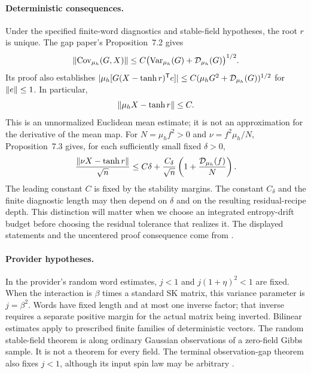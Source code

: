 \paragraph{Deterministic consequences.}
Under the specified finite-word diagnostics and stable-field hypotheses,
the root $r$ is unique. The gap paper's Proposition~7.2 gives
\begin{equation}\label{eq:accepted-directional}
 \left\lVert\operatorname{Cov}_{\mu_h}(G,X)\right\rVert
 \le C\bigl(\operatorname{Var}_{\mu_h}(G)+\mathcal D_{\mu_h}(G)\bigr)^{1/2}.
\end{equation}
Its proof also establishes
$|\mu_h[G(X-\tanh r)^{\mathsf T}e]|
\le C(\mu_h G^2+\mathcal D_{\mu_h}(G))^{1/2}$ for $\left\lVert e\right\rVert\le1$.
In particular,
\begin{equation}\label{eq:accepted-ordinary-mean}
 \left\lVert\mu_hX-\tanh r\right\rVert\le C.
\end{equation}
This is an unnormalized Euclidean mean estimate; it is not an
approximation for the derivative of the mean map.
For $N=\mu_h f^2>0$ and $\nu=f^2\mu_h/N$, Proposition~7.3 gives, for
each sufficiently small fixed $\delta>0$,
\begin{equation}\label{eq:accepted-weighted-mean}
 \frac{\left\lVert\nu X-\tanh r\right\rVert}{\sqrt n}
 \le C\delta+\frac{C_\delta}{\sqrt n}
                 \left(1+\frac{\mathcal D_{\mu_h}(f)}N\right).
\end{equation}
The leading constant $C$ is fixed by the stability margins. The
constant $C_\delta$ and the finite diagnostic length may then depend on
$\delta$ and on the resulting residual-recipe depth. This distinction
will matter when we choose an integrated entropy-drift budget before
choosing the residual tolerance that realizes it. The displayed
statements and the uncentered proof consequence come from
\cite[Section~6, Lemma~7.1, Proposition~7.2 and its proof,
Proposition~7.3]{AcceptedGap}.

\paragraph{Provider hypotheses.}
In the provider's random word estimates, $j<1$ and
$j(1+\eta)^2<1$ are fixed. When the interaction is $\beta$ times a
standard SK matrix, this variance parameter is $j=\beta^2$.
Words have fixed length and at most one inverse factor; that inverse
requires a separate positive margin for the actual matrix being
inverted. Bilinear estimates apply to prescribed finite families of
deterministic vectors. The random stable-field theorem is along ordinary
Gaussian observations of a zero-field Gibbs sample. It is not a theorem for every field.
The terminal observation-gap theorem also fixes $j<1$,
although its input spin law may be arbitrary
\cite[Proposition~5.1, Corollary~5.2, Proposition~8.3]{AcceptedGap}.

